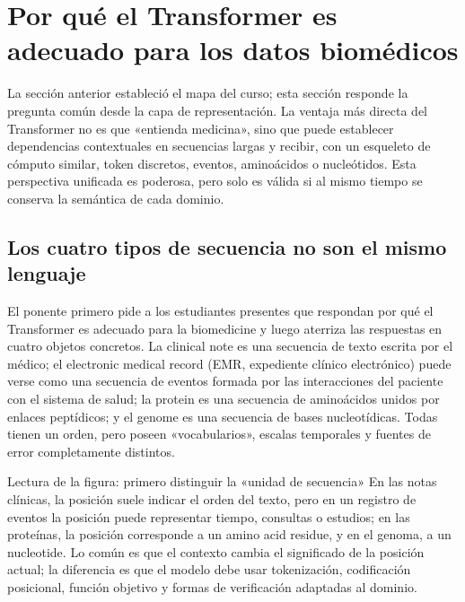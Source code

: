\section{Por qué el Transformer es adecuado para los datos biomédicos}

La sección anterior estableció el mapa del curso; esta sección responde la pregunta común desde la capa de representación. La ventaja más directa del Transformer no es que «entienda medicina», sino que puede establecer dependencias contextuales en secuencias largas y recibir, con un esqueleto de cómputo similar, token discretos, eventos, aminoácidos o nucleótidos. Esta perspectiva unificada es poderosa, pero solo es válida si al mismo tiempo se conserva la semántica de cada dominio.

\subsection{Los cuatro tipos de secuencia no son el mismo lenguaje}

El ponente primero pide a los estudiantes presentes que respondan por qué el Transformer es adecuado para la biomedicine y luego aterriza las respuestas en cuatro objetos concretos. La clinical note es una secuencia de texto escrita por el médico; el electronic medical record (EMR, expediente clínico electrónico) puede verse como una secuencia de eventos formada por las interacciones del paciente con el sistema de salud; la protein es una secuencia de aminoácidos unidos por enlaces peptídicos; y el genome es una secuencia de bases nucleotídicas. Todas tienen un orden, pero poseen «vocabularios», escalas temporales y fuentes de error completamente distintos.



\begin{knowledgebox}{Lectura de la figura: primero distinguir la «unidad de secuencia»}
En las notas clínicas, la posición suele indicar el orden del texto, pero en un registro de eventos la posición puede representar tiempo, consultas o estudios; en las proteínas, la posición corresponde a un amino acid residue, y en el genoma, a un nucleotide. Lo común es que el contexto cambia el significado de la posición actual; la diferencia es que el modelo debe usar tokenización, codificación posicional, función objetivo y formas de verificación adaptadas al dominio.
\end{knowledgebox}

